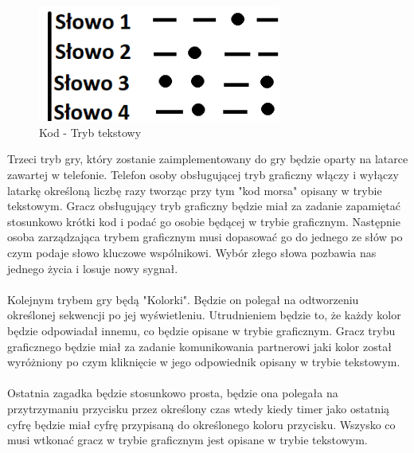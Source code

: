 	\begin{figure}[!htb]
	\begin{center}
		\includegraphics[width=8cm]{rys/gra6.png}
		\caption{Kod - Tryb tekstowy}
		\label{rys:rysunek001}
	\end{center}
\end{figure}
\hspace{-0.60cm}Trzeci tryb gry, który zostanie zaimplementowany do gry będzie oparty na latarce zawartej w telefonie. Telefon osoby obsługującej tryb graficzny włączy i wyłączy latarkę określoną liczbę razy tworząc przy tym "kod morsa" opisany w trybie tekstowym. Gracz obsługujący tryb graficzny będzie miał za zadanie zapamiętać stosunkowo krótki kod i podać go osobie będącej w trybie graficznym. Następnie osoba zarządzająca trybem graficznym musi dopasować go do jednego ze słów po czym podaje słowo kluczowe wspólnikowi. Wybór złego słowa pozbawia nas jednego życia i losuje nowy sygnał.
\\
\\
Kolejnym trybem gry będą "Kolorki". Będzie on polegał na odtworzeniu określonej sekwencji po jej wyświetleniu. Utrudnieniem będzie to, że każdy kolor będzie odpowiadał innemu, co będzie opisane w trybie graficznym. Gracz trybu graficznego będzie miał za zadanie komunikowania partnerowi jaki kolor został wyróżniony po czym kliknięcie w jego odpowiednik opisany w trybie tekstowym.
\\
\\
Ostatnia zagadka będzie stosunkowo prosta, będzie ona polegała na przytrzymaniu przycisku przez określony czas wtedy kiedy timer jako ostatnią cyfrę będzie miał cyfrę przypisaną do określonego koloru przycisku. Wszysko co musi wtkonać gracz w trybie graficznym jest opisane w trybie tekstowym.


